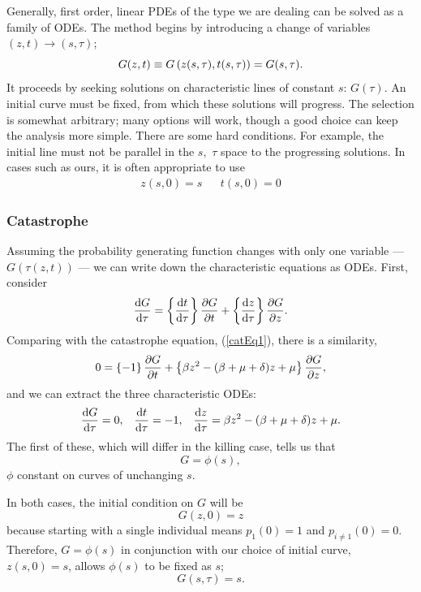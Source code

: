 Generally, first order, linear PDEs of the type we are dealing can be solved as a family of ODEs. The method begins by introducing a change of variables $(z,t)\to(s,\tau)$;
$$G(z,t)\equiv G\left( z(s, \tau),t(s,\tau)\right) = G(s, \tau).$$
It proceeds by seeking solutions on characteristic lines of constant $s$: $G(\tau)$. An initial curve must be fixed, from which these solutions will progress. The selection is somewhat arbitrary; many options will work, though a good choice can keep the analysis more simple. There are some hard conditions. For example, the initial line must not be parallel in the $s,$ $\tau$ space to the progressing solutions. In cases such as ours, it is often appropriate to use
\begin{align}
\label{ICs}
z(s,0) = s&& t(s,0) = 0
\end{align}
\subsubsection*{Catastrophe}
Assuming the probability generating function changes with only  one variable --- $G(\tau(z, t))$ --- we can write down the characteristic equations as ODEs. First, consider
\begin{equation*}
\displaystyle\frac{{\rm d} G}{{\rm d} \tau} =  \left\{\displaystyle\frac{{\rm d} t}{{\rm d} \tau}\right\}  \displaystyle\frac{\partial G}{\partial t}+ \left\{\displaystyle\frac{{\rm d} z}{{\rm d} \tau} \right\}\displaystyle\frac{\partial G}{\partial z}.
\end{equation*}
Comparing with the catastrophe equation, (\ref{catEq1}), there is a similarity,
$$0=  \left\{- 1\right\}\displaystyle\frac{\partial G}{\partial t} + \left\{\beta z^2 -( \beta + \mu + \delta)z + \mu\right\} \displaystyle\frac{\partial G}{\partial z},$$
and we can extract the three characteristic ODEs:
\begin{align*}
\label{Char1}
\displaystyle\frac{{\rm d} G}{{\rm d} \tau} = 0,&& \displaystyle\frac{{\rm d} t}{{\rm d} \tau} = -1, && \displaystyle\frac{{\rm d} z}{{\rm d} \tau} = \beta z^2 - (\beta + \mu + \delta)z + \mu.
\end{align*}
The first of these, which will differ in the killing case, tells us that  
$$G = \phi{(s)},$$
$\phi$ constant on curves of unchanging $s$.\par
In both cases, the initial condition on $G$ will be $$G(z, 0) = z$$ because starting with a single individual means $p_1(0) =1$ and $p_{i\neq1}(0) = 0$. Therefore, $G = \phi{(s)}$ in conjunction with our choice of initial curve, $z(s, 0) = s$, allows $\phi(s)$ to be fixed as $s$;
$$G(s,\tau) = s.$$\par

